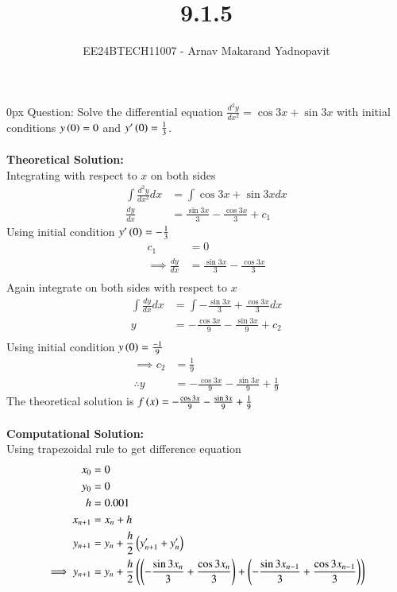 \documentclass[journal,12pt,onecolumn]{IEEEtran}
\theoremstyle{remark}
\begin{document}
\title{9.1.5}
\author{EE24BTECH11007 - Arnav Makarand Yadnopavit}
\maketitle
\renewcommand{\thefigure}{\theenumi}
\renewcommand{\thetable}{\theenumi}
\parindent 0px Question: Solve the differential equation $\frac{d^2y}{dx^2}=\cos3x+\sin3x$ with initial conditions $y\left(0\right)=0$ and $y^\prime\left(0\right)=\frac{1}{3}$. \\
\solution\\
\textbf{Theoretical Solution:}\\
Integrating with respect to $x$ on both sides
\begin{align}
    \int\frac{d^2y}{dx^2}dx&=\int \cos3x+\sin3xdx \label{eq:first}\\
    \frac{dy}{dx}&=\frac{\sin3x}{3}-\frac{\cos3x}{3}+c_1    
\end{align}
Using initial condition $y^\prime\left(0\right)=-\frac{1}{3}$
\begin{align}
    c_1&=0\\
    \implies\frac{dy}{dx}&=\frac{\sin3x}{3}-\frac{\cos3x}{3}\label{eq:y}\\
\end{align}
Again integrate on both sides with respect to $x$
\begin{align}
    \int \frac{dy}{dx} dx&=\int -\frac{\sin3x}{3}+\frac{\cos3x}{3} dx\\
    y&=-\frac{\cos3x}{9}-\frac{\sin3x}{9}+c_2\\
\end{align}
Using initial condition $y\left(0\right)=\frac{-1}{9}$
\begin{align}
    \implies c_2&=\frac{1}{9}\\
    \therefore y&=-\frac{\cos3x}{9}-\frac{\sin3x}{9}+\frac{1}{9}
\end{align}
The theoretical solution is $f\left(x\right)=-\frac{\cos3x}{9}-\frac{\sin3x}{9}+\frac{1}{9}$\\\\
\textbf{Computational Solution:}\\
Using trapezoidal rule to get difference equation
\begin{align}
    x_0&=0\\
    y_0&=0\\
    h&=0.001\\
    x_{n+1}&=x_{n}+h\\
    y_{n+1}&=y_n+\frac{h}{2}\left(y^\prime_{n+1}+y^\prime_{n}\right)\\
    \implies y_{n+1}&=y_n+\frac{h}{2}\left(\left(-\frac{\sin3x_{n}}{3}+\frac{\cos3x_{n}}{3}\right)+\left(-\frac{\sin3x_{n-1}}{3}+\frac{\cos3x_{n-1}}{3}\right)\right)
\end{align}
\end{document}
